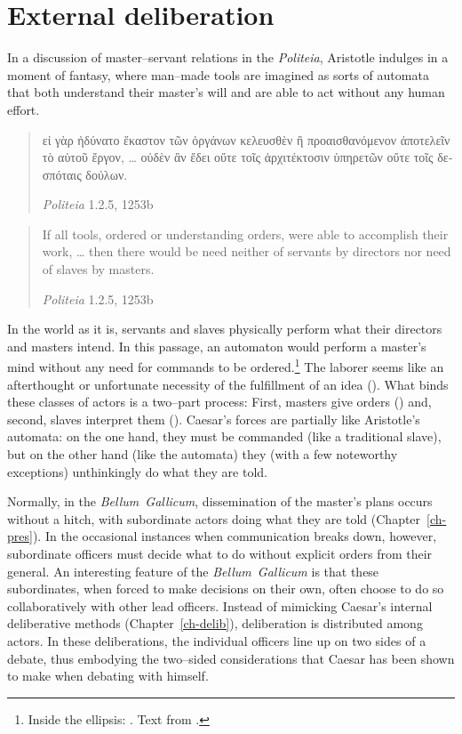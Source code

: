 \documentclass[12pt,letterpaper,oneside,final]{memoir}
\begin{document}
\chapter{External deliberation}%
\label{ch-delib-subs}%

In a discussion of master--servant relations in the \emph{Politeia}, Aristotle indulges in a moment of fantasy, where man--made tools are imagined as sorts of automata that both understand their master's will and are able to act without any human effort. \blockquote[\emph{Politeia} 1.2.5, 1253b]{\textgreek{εἰ γὰρ ἠδύνατο ἕκαστον τῶν ὀργάνων κελευσθὲν ἢ προαισθανόμενον ἀποτελεῖν τὸ αὑτοῦ ἔργον, \ldots{} οὐδὲν ἂν ἔδει οὔτε τοῖς ἀρχιτέκτοσιν ὑπηρετῶν οὔτε τοῖς δεσπόταις δούλων.}} \blockquote[\emph{Politeia} 1.2.5, 1253b]{If all tools, ordered or understanding orders, were able to accomplish their work, \ldots{} then there would be need neither of servants by directors nor need of slaves by masters.} In the world as it is, servants and slaves physically perform what their directors and masters intend. In this passage, an automaton would perform a master's mind without any need for commands to be ordered.\footnote{Inside the ellipsis: . Text from \textcite{ross1957}.} The laborer seems like an afterthought or unfortunate necessity of the fulfillment of an idea (). What binds these classes of actors is a two--part process: First, masters give orders () and, second, slaves interpret them (). Caesar's forces are partially like Aristotle's automata: on the one hand, they must be commanded (like a traditional slave), but on the other hand (like the automata) they (with a few noteworthy exceptions) unthinkingly do what they are told. 

Normally, in the \emph{Bellum~Gallicum}, dissemination of the master's plans occurs without a hitch, with subordinate actors doing what they are told (Chapter~\ref{ch-pres}). In the occasional instances when communication breaks down, however, subordinate officers must decide what to do without explicit orders from their general. An interesting feature of the \emph{Bellum~Gallicum} is that these subordinates, when forced to make decisions on their own, often choose to do so collaboratively with other lead officers. Instead of mimicking Caesar's internal deliberative methods (Chapter~\ref{ch-delib}), deliberation is distributed among actors. In these deliberations, the individual officers line up on two sides of a debate, thus embodying the two--sided considerations that Caesar has been shown to make when debating with himself. 
\end{document}
